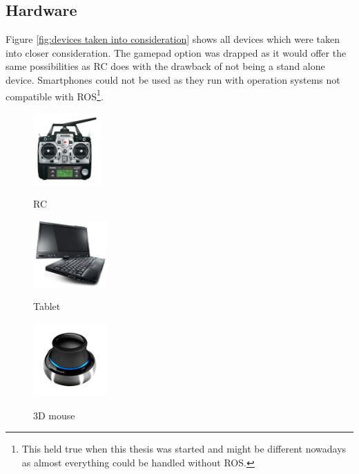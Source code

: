 \subsection{Hardware}
\label{sub:hardware}

Figure \ref{fig:devices taken into consideration} shows all devices which were taken into closer consideration. The gamepad option was drapped as it would offer the same possibilities as RC does with the drawback of not being a stand alone device. Smartphones could not be used as they run with operation systems not compatible with \textsc{ROS}\footnote{This held true when this thesis was started and might be different nowadays as almost everything could be handled without ROS.}.

\begin{figure}[h]		
	\small{
		\begin{center}
			\parbox[b]{0.25\textwidth}{\includegraphics[width=0.23\textwidth]{futaba_7C_radio}
			\begin{center}RC \end{center}}
			\hspace{0.05\textwidth}
			\parbox[b]{0.25\textwidth}{\includegraphics[width=0.25\textwidth]{x220t_hero}
			\begin{center}Tablet \end{center}}
			\hspace{0.05 \textwidth}
			\parbox[b]{0.25\textwidth}{\includegraphics[width=0.25\textwidth]{3dx_productimage}
			\begin{center}3D mouse \end{center}}			

\end{center}}
\end{figure}
